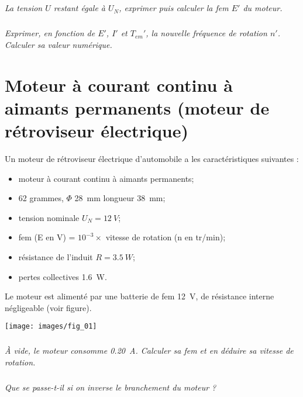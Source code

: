 \documentclass[10pt,fleqn]{article} %
\begin{document}
\begin{multicols}{2}
\begin{multicols}{2}
\subparagraph{}\textit{La tension $U$ restant égale à $U_N$, exprimer puis calculer la fem $E'$ du moteur. }
\ifprof
\begin{corrige}
\end{corrige}
\else
\fi


\subparagraph{}\textit{ Exprimer, en fonction de $E'$, $I'$ et $T_{em}'$, la nouvelle fréquence de rotation $n'$. Calculer sa
valeur numérique. }
\ifprof
\begin{corrige}
\end{corrige}
\else
\fi



\newpage

\section*{Moteur à courant continu à aimants permanents (moteur de
rétroviseur électrique)}

\setcounter{exo}{0}

Un moteur de rétroviseur électrique d’automobile a les caractéristiques suivantes :
\begin{itemize}
\item moteur à courant continu à aimants permanents;
\item 62 grammes, $\Phi$ \SI{28}{mm} longueur \SI{38}{mm};
\item tension nominale $U_N=\SI{12}{V}$;
\item fem (E en V) = $10^{-3} \times$ vitesse de rotation (n en tr/min);
\item résistance de l’induit $R=\SI{3,5}{W}$;
\item pertes collectives \SI{1,6}{W}.
\end{itemize}
Le moteur est alimenté par une batterie de fem \SI{12}{V}, de
résistance interne négligeable (voir figure).

\begin{center}
\texttt{[image: images/fig\_01]}
\end{center}

\subparagraph{}\textit{À vide, le moteur consomme \SI{0,20}{A}. Calculer sa fem et en déduire sa vitesse de rotation.}
\ifprof
\begin{corrige}
\end{corrige}
\else
\fi


\subparagraph{}\textit{Que se passe-t-il si on inverse le branchement du moteur ?}
\ifprof
\begin{corrige}
\end{corrige}
\else
\fi


\end{multicols}
\end{multicols}
\end{document}
